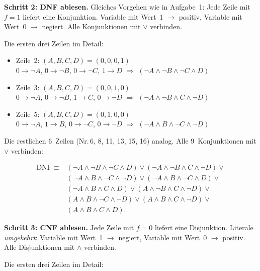 \documentclass[a4paper,12pt]{article}
\begin{document}
\textbf{Schritt 2: DNF ablesen.}
Gleiches Vorgehen wie in Aufgabe~1: Jede Zeile mit $f=1$ liefert
eine Konjunktion. Variable mit Wert~1 $\to$ positiv,
Variable mit Wert~0 $\to$ negiert. Alle Konjunktionen mit $\vee$
verbinden.

Die ersten drei Zeilen im Detail:

\begin{itemize}[nosep]
\item Zeile~2: $(A,B,C,D) = (0,0,0,1)$\\
      $0 \to \neg A$,\; $0 \to \neg B$,\;
      $0 \to \neg C$,\; $1 \to D$
      \;$\Rightarrow$\; $(\neg A \wedge \neg B \wedge \neg C \wedge D)$
\item Zeile~3: $(A,B,C,D) = (0,0,1,0)$\\
      $0 \to \neg A$,\; $0 \to \neg B$,\;
      $1 \to C$,\; $0 \to \neg D$
      \;$\Rightarrow$\; $(\neg A \wedge \neg B \wedge C \wedge \neg D)$
\item Zeile~5: $(A,B,C,D) = (0,1,0,0)$\\
      $0 \to \neg A$,\; $1 \to B$,\;
      $0 \to \neg C$,\; $0 \to \neg D$
      \;$\Rightarrow$\; $(\neg A \wedge B \wedge \neg C \wedge \neg D)$
\end{itemize}

Die restlichen 6~Zeilen (Nr.\,6, 8, 11, 13, 15, 16) analog.
Alle 9~Konjunktionen mit $\vee$ verbinden:

\begin{align*}
\text{DNF} \;\equiv\; &(\neg A \wedge \neg B \wedge \neg C \wedge D) \vee
(\neg A \wedge \neg B \wedge C \wedge \neg D) \vee {} \\
& (\neg A \wedge B \wedge \neg C \wedge \neg D) \vee
(\neg A \wedge B \wedge \neg C \wedge D) \vee {} \\
& (\neg A \wedge B \wedge C \wedge D) \vee
(A \wedge \neg B \wedge C \wedge \neg D) \vee {} \\
& (A \wedge B \wedge \neg C \wedge \neg D) \vee
(A \wedge B \wedge C \wedge \neg D) \vee {} \\
& (A \wedge B \wedge C \wedge D).
\end{align*}

\textbf{Schritt 3: CNF ablesen.}
Jede Zeile mit $f=0$ liefert eine Disjunktion.
Literale \emph{umgekehrt}: Variable mit Wert~1 $\to$ negiert,
Variable mit Wert~0 $\to$ positiv. Alle Disjunktionen mit $\wedge$
verbinden.

Die ersten drei Zeilen im Detail:
\end{document}
